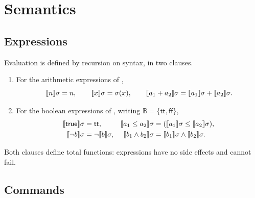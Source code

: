 \section{Semantics}
\label{sec:semantics}

\subsection{Expressions}
\label{sub:expr-sem}

\begin{definition}
\label{def:aeval}
Evaluation is defined by recursion on syntax, in two clauses.

\begin{enumerate}
\item For the arithmetic expressions of ,
\[
  \sem{n}\sigma = n, \qquad
  \sem{x}\sigma = \sigma(x), \qquad
  \sem{a_1 + a_2}\sigma = \sem{a_1}\sigma + \sem{a_2}\sigma .
\]
\item For the boolean expressions of , writing
$\mathbb{B} = \{\mathsf{tt}, \mathsf{ff}\}$,
\begin{align*}
  \sem{\kw{true}}\sigma &= \mathsf{tt}, &
  \sem{a_1 \le a_2}\sigma &= (\sem{a_1}\sigma \le \sem{a_2}\sigma), \\
  \sem{\lnot b}\sigma &= \lnot \sem{b}\sigma, &
  \sem{b_1 \land b_2}\sigma &= \sem{b_1}\sigma \land \sem{b_2}\sigma .
\end{align*}
\end{enumerate}
Both clauses define total functions: expressions have no side effects and
cannot fail.
\end{definition}

\subsection{Commands}
\label{sub:cmd-sem}

